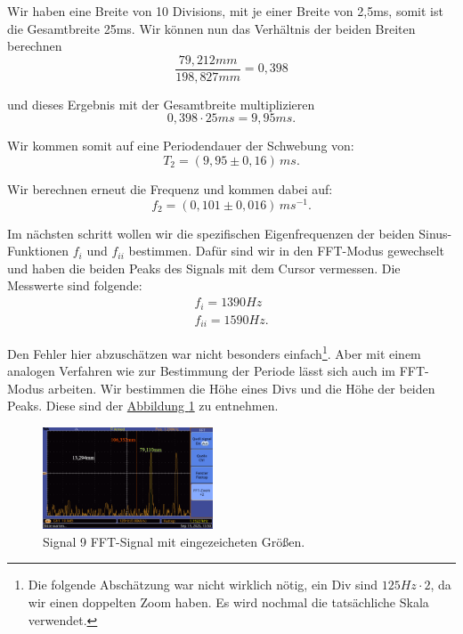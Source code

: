 Wir haben eine Breite von 10 Divisions, mit je einer Breite von 2,5ms, somit ist die Gesamtbreite 25ms. Wir können nun das Verhältnis der beiden Breiten berechnen
\begin{equation}
    \frac{79,212 mm}{198,827 mm} = 0,398
\end{equation}

und dieses Ergebnis mit der Gesamtbreite multiplizieren
\begin{equation}
    0,398 \cdot 25ms = 9,95ms.
\end{equation}

Wir kommen somit auf eine Periodendauer der Schwebung von:
\begin{equation}
\boxed{
    T_{2} = (9,95 \pm 0,16) \, ms
}.
\end{equation}

Wir berechnen erneut die Frequenz und kommen dabei auf:
\begin{equation}
\boxed{
    f_2 = (0,101 \pm 0,016) \, ms^{-1}
}.
\end{equation}

Im nächsten schritt wollen wir die spezifischen Eigenfrequenzen der beiden Sinus-Funktionen $f_{i}$ und $f_{ii}$ bestimmen. 
Dafür sind wir in den FFT-Modus gewechselt und haben die beiden Peaks des Signals mit dem Cursor vermessen. Die Messwerte sind folgende:
\begin{align}
    f_{i} = 1390 Hz \\
    f_{ii} = 1590 Hz.
\end{align}

Den Fehler hier abzuschätzen war nicht besonders einfach\footnote{Die folgende Abschätzung war nicht wirklich nötig, ein Div sind $125Hz \cdot 2$, da wir einen doppelten Zoom haben. Es wird nochmal die tatsächliche Skala verwendet.}. Aber mit einem analogen Verfahren wie zur Bestimmung der Periode lässt sich auch im FFT-Modus arbeiten. 
Wir bestimmen die Höhe eines Divs und die Höhe der beiden Peaks. Diese sind der \hyperref[fig:s9_fft_ung]{Abbildung \ref*{fig:s9_fft_ung}} zu entnehmen.

\begin{figure} [h!]
    \centering
        \includegraphics[width=0.45\textwidth]{img/25/Signale2/Sig9-FFT-ungenauigkeiten.pdf}
    \caption{Signal 9 FFT-Signal mit eingezeicheten Größen.}
    \label{fig:s9_fft_ung}
\end{figure}

